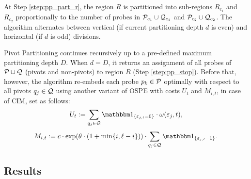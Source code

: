 At Step \ref{step:pp_part_r}, the region $R$ is partitioned into sub-regions
$R_{c_1}$ and $R_{c_2}$ proportionally to the number of probes in
${\mathcal{P}}_{c_1} \cup {\mathcal{Q}}_{c_1}$ and ${\mathcal{P}}_{c_2} \cup {\mathcal{Q}}_{c_2}$. The algorithm
alternates between vertical (if current partitioning depth $d$ is even) and
horizontal (if $d$ is odd) divisions.

Pivot Partitioning continues recursively up to a pre-defined maximum
partitioning depth $D$. When $d=D$, it returns an assignment of all probes of
${\mathcal{P}} \cup {\mathcal{Q}}$ (pivots and non-pivots) to region $R$ (Step
\ref{step:pp_stop}). Before that, however, the algorithm re-embeds each probe
$p_k \in {\mathcal{P}}$ optimally with respect to all pivots $q_j \in {\mathcal{Q}}$ using
another variant of OSPE with costs $U_t$ and $M_{i,t}$, in case of CIM, set as
follows:
\[
U_t := \sum_{q_j \in \CalQ} \Ind{\eps_{j,t}=0} \cdot \omega(\eps_{j},t),
\]
\[
M_{i,t} := c \cdot \exp(\theta\cdot (1+\min\{i,\ell-i\}))
           \cdot \sum_{q_j \in \CalQ} \Ind{\eps_{j,t}=1}.
\]

\subsection{Results}


